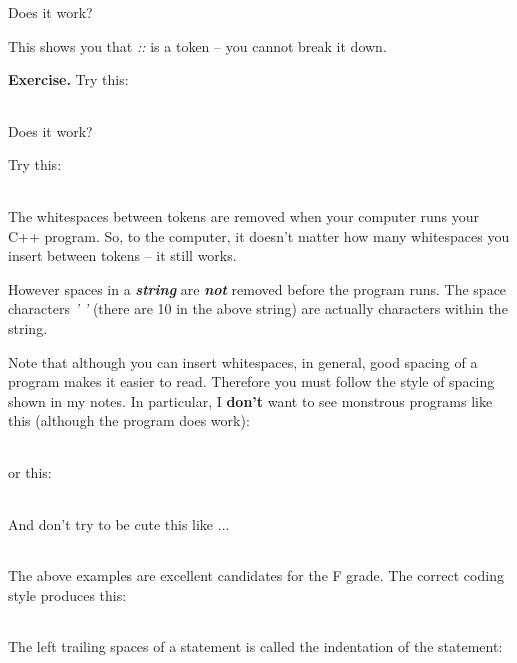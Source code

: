 \documentclass[
]{article}
\begin{document}
Does it work?

This shows you that \emph{::} is a token -- you cannot break it down.

\textbf{Exercise.} Try this:

\begin{longtable}[]{@{}@{}}
\toprule
\endhead
\bottomrule
\end{longtable}

Does it work?

Try this:

\begin{longtable}[]{@{}@{}}
\toprule
\endhead
\bottomrule
\end{longtable}

The whitespaces between tokens are removed when your computer runs your
C++ program. So, to the computer, it doesn't matter how many whitespaces
you insert between tokens -- it still works.

However spaces in a \emph{\textbf{string}} are \emph{\textbf{not}}
removed before the program runs. The space characters \emph{' '} (there
are 10 in the above string) are actually characters within the string.

Note that although you can insert whitespaces, in general, good spacing
of a program makes it easier to read. Therefore you must follow the
style of spacing shown in my notes. In particular, I \textbf{don't} want
to see monstrous programs like this (although the program does work):

\begin{longtable}[]{@{}@{}}
\toprule
\endhead
\bottomrule
\end{longtable}

or this:

\begin{longtable}[]{@{}@{}}
\toprule
\endhead
\bottomrule
\end{longtable}

And don't try to be cute this like ...

\begin{longtable}[]{@{}@{}}
\toprule
\endhead
\bottomrule
\end{longtable}

The above examples are excellent candidates for the F grade. The correct
coding style produces this:

\begin{longtable}[]{@{}@{}}
\toprule
\endhead
\bottomrule
\end{longtable}

The left trailing spaces of a statement is called the indentation of the
statement:
\end{document}
